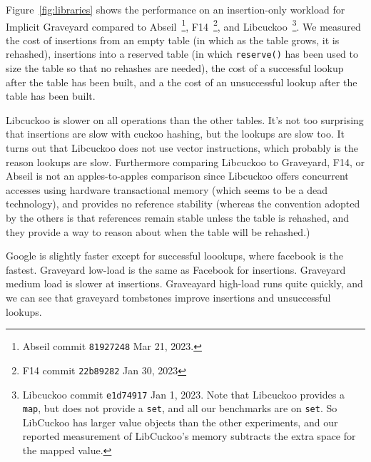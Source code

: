 \documentclass[10pt]{article}
\theoremstyle{remark}
\theoremstyle{remark}
\newcommand{\figref}[1]{Figure~\ref{fig:#1}}
\begin{document}
\figref{libraries} shows the performance on an insertion-only workload
for Implicit Graveyard compared to
Abseil~\cite{Abseil17}\footnote{Abseil commit \texttt{81927248} Mar
21, 2023.}, F14~\cite{BronsonSh19}\footnote{F14 commit
\texttt{22b89282} Jan 30, 2023}, and Libcuckoo~\cite{LiAnKa14,
  GoyalFaLi23}\footnote{Libcuckoo commit \texttt{e1d74917} Jan 1,
2023.  Note that Libcuckoo provides a \texttt{map}, but does not
provide a \texttt{set}, and all our benchmarks are on \texttt{set}.
So LibCuckoo has larger value objects than the other experiments, and
our reported measurement of LibCuckoo's memory subtracts the extra
space for the mapped value.}.  We measured the cost of insertions from
an empty table (in which as the table grows, it is rehashed),
insertions into a reserved table (in which \texttt{reserve()} has been
used to size the table so that no rehashes are needed), the cost of a
successful lookup after the table has been built, and a the cost of an
unsuccessful lookup after the table has been built.

Libcuckoo is slower on all operations than the other tables.  It's not
too surprising that insertions are slow with cuckoo hashing, but the
lookups are slow too.  It turns out that Libcuckoo does not use vector
instructions, which probably is the reason lookups are slow.
Furthermore comparing Libcuckoo to Graveyard, F14, or Abseil is not an
apples-to-apples comparison since Libcuckoo offers concurrent accesses
using hardware transactional memory (which seems to be a dead
technology), and provides no reference stability (whereas the
convention adopted by the others is that references remain stable
unless the table is rehashed, and they provide a way to reason about
when the table will be rehashed.)

Google is slightly faster except for successful loookups, where
facebook is the fastest.  Graveyard low-load is the same as Facebook
for insertions. Graveyard medium load is slower at insertions.
Graveayard high-load runs quite quickly, and we can see that graveyard
tombstones improve insertions and unsuccessful lookups.  

\end{document}
